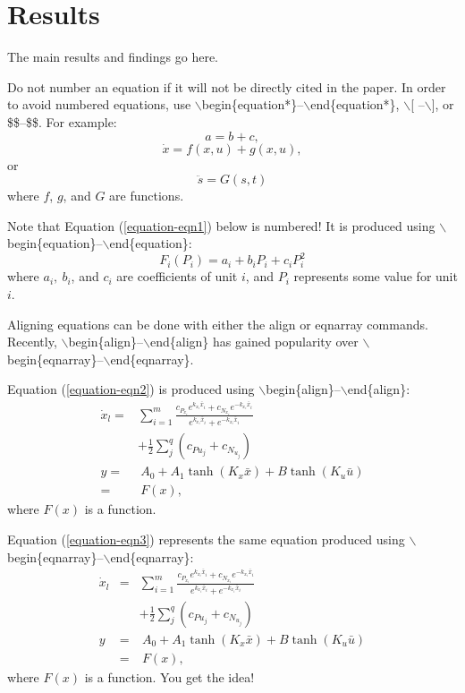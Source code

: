 \documentclass[conference]{IEEEtran}
\begin{document}
\section{Results}
The main results and findings go here.

Do not number an equation if it will not be directly cited
in the paper.  In order to avoid numbered equations, use
$\backslash$begin\{equation*\}--$\backslash$end\{equation*\},
$\backslash$[ --$\backslash$], or \$\$--\$\$.  For example:
\begin{equation*}
a = b + c,
\end{equation*}
$$\dot x = f(x,u) + g(x,u),$$
or
\[\ddot s=G(s,t)\]
where $f$, $g$, and $G$ are functions.

Note that Equation (\ref{equation-eqn1}) below is numbered!  It is
produced using $\backslash$begin\{equation\}--$\backslash$end\{equation\}:
\begin{equation}
F_i(P_i)=a_{i}+b_{i}P_i+c_{i}P_{i}^2
\label{equation-eqn1}
\end{equation}
where $a_{i},\ b_{i}$, and $c_{i}$ are coefficients of unit $i$, and $P_i$
represents some value for unit $i$.

Aligning equations can be done with
either the align or eqnarray commands.  Recently,
$\backslash$begin\{align\}--$\backslash$end\{align\} has gained popularity
over $\backslash$begin\{eqnarray\}--$\backslash$end\{eqnarray\}.

Equation (\ref{equation-eqn2}) is produced using
$\backslash$begin\{align\}--$\backslash$end\{align\}:
\begin{align}
\dot {x}_l=& \sum_{i = 1}^m {\frac{c_{P_{x_i} } e^{k_{x_i}\bar{x}_i} + c_{N_{x_i} }
e^{ -  k_{x_i} \bar{x}_i}}{e^{k_{x_i} \bar{x}_i} + e^{ - k_{x_i} \bar{x}_i}}} \nonumber\\
& + \frac{1}{2}\sum\limits_j^q (c_{P{u_j }} + c_{N _{u_j }} ) \nonumber\\
y=& \ A_0 + A_1 \tanh (K_x \bar {x}) + B\tanh (K_u \bar {u}) \nonumber\\
 =& \ F(x),
\label{equation-eqn2}
\end{align}
where $F(x)$ is a function.

Equation (\ref{equation-eqn3}) represents the same equation produced
using $\backslash$begin\{eqnarray\}--$\backslash$end\{eqnarray\}:
\begin{eqnarray}
\dot {x}_l&=& \sum_{i = 1}^m {\frac{c_{P_{x_i} } e^{k_{x_i}\bar{x}_i} + c_{N_{x_i} }
e^{ - k_{x_i} \bar{x}_i}}{e^{k_{x_i} \bar{x}_i} + e^{ - k_{x_i} \bar{x}_i}}} \nonumber\\
&&+ \frac{1}{2}\sum\limits_j^q (c_{P{u_j }} + c_{N _{u_j }} ) \nonumber\\
y&=& \ A_0 + A_1 \tanh (K_x \bar {x}) + B\tanh (K_u \bar {u})\nonumber\\
&=& \ F(x),
\label{equation-eqn3}
\end{eqnarray}
where $F(x)$ is a function.  You get the idea!
\end{document}
